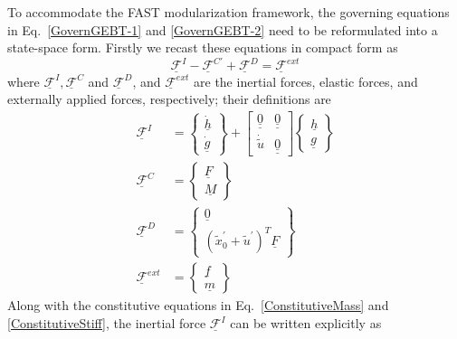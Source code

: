 \documentclass{aiaa-tc}
\renewcommand{\vec}[1]{\underline{#1}}
\begin{document}
To accommodate the FAST modularization framework, the governing equations in Eq.~\eqref{GovernGEBT-1} and \eqref{GovernGEBT-2} need to be reformulated into a state-space form. Firstly we recast these equations in compact form as
\begin{equation}
    \label{CompactGovernGEBT}
    \underline{\mathcal{F}}^I - \underline{\mathcal{F}}^{C\prime} + \underline{\mathcal{F}}^D = \underline{\mathcal{F}}^{ext}
\end{equation}
where $\underline{\mathcal{F}}^I, \underline{\mathcal{F}}^C$ and $\underline{\mathcal{F}}^D$, and $\underline{\mathcal{F}}^{ext}$ are the inertial forces, elastic forces, and externally applied forces, respectively; their definitions are
\begin{align}
    \label{InertialForce}
    \underline{\mathcal{F}}^I &= \begin{Bmatrix}
    \dot{\underline{h}} \\
    \dot{\underline{g}}
    \end{Bmatrix}
    + \begin{bmatrix}
    \underline{\underline{0}} & \underline{\underline{0}} \\
    \dot{\tilde{u}}  &  \underline{\underline{0}}
    \end{bmatrix}
    \begin{Bmatrix}
    \vec{h} \\
    \vec{g}
    \end{Bmatrix} \\
    \label{ElasticForceFc}
     \underline{\mathcal{F}}^C &= \begin{Bmatrix}
    \underline{F} \\
    \underline{M}
    \end{Bmatrix} \\
    \label{ElasticForceFd}
    \underline{\mathcal{F}}^D &= \begin{Bmatrix}
    \underline{0} \\
    (\tilde{x}^\prime_0 + \tilde{u}^\prime)^T \underline{F}
    \end{Bmatrix} \\
    \label{AppliedForce}
    \underline{\mathcal{F}}^{ext} &= \begin{Bmatrix}
    \underline{f} \\
    \underline{m}
    \end{Bmatrix}
\end{align}   
Along with the constitutive equations in Eq.~\eqref{ConstitutiveMass} and \eqref{ConstitutiveStiff}, the inertial force $\underline{\mathcal{F}}^I$ can be written explicitly as
\end{document}
